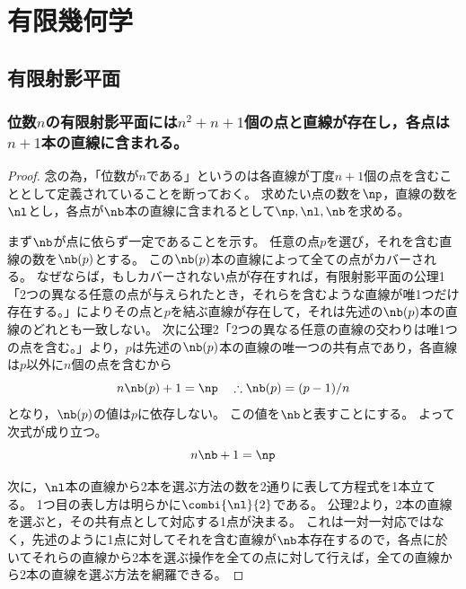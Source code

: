 \chapter{有限幾何学}
    \section{有限射影平面}
        \subsection{位数\texorpdfstring{$n$}{n}の有限射影平面には\texorpdfstring{$n^2+n+1$}{n\string^2+n+1}個の点と直線が存在し，各点は\texorpdfstring{$n+1$}{n+1}本の直線に含まれる。}
            \begin{proof}
                念の為，「位数が$n$である」というのは各直線が丁度$n+1$個の点を含むこととして定義されていることを断っておく。
                求めたい点の数を$\np$，直線の数を$\nl$とし，各点が$\nb$本の直線に含まれるとして$\np,\nl,\nb$を求める。
                \par
                まず$\nb$が点に依らず一定であることを示す。
                任意の点$p$を選び，それを含む直線の数を$\nb(p)$とする。
                この$\nb(p)$本の直線によって全ての点がカバーされる。
                なぜならば，もしカバーされない点が存在すれば，有限射影平面の公理1「2つの異なる任意の点が与えられたとき，それらを含むような直線が唯1つだけ存在する。」によりその点と$p$を結ぶ直線が存在して，それは先述の$\nb(p)$本の直線のどれとも一致しない。
                次に公理2「2つの異なる任意の直線の交わりは唯1つの点を含む。」より，$p$は先述の$\nb(p)$本の直線の唯一つの共有点であり，各直線は$p$以外に$n$個の点を含むから
                \[ n \nb(p) + 1 = \np \quad \therefore \nb(p) = (p-1)/n \]
                となり，$\nb(p)$の値は$p$に依存しない。
                この値を$\nb$と表すことにする。
                よって次式が成り立つ。
                \begin{equation}
                    n \nb + 1= \np
                \end{equation}
                \par
                次に，$\nl$本の直線から2本を選ぶ方法の数を2通りに表して方程式を1本立てる。
                1つ目の表し方は明らかに$\combi{\nl}{2}$である。
                公理2より，2本の直線を選ぶと，その共有点として対応する1点が決まる。
                これは一対一対応ではなく，先述のように1点に対してそれを含む直線が$\nb$本存在するので，各点に於いてそれらの直線から2本を選ぶ操作を全ての点に対して行えば，全ての直線から2本の直線を選ぶ方法を網羅できる。

\end{proof}
